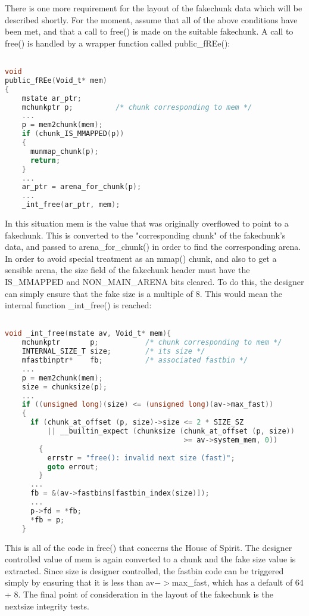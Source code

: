 \documentclass[12pt]{article}
\begin{document}
There is one more requirement for the layout of the fakechunk data
which will be described shortly. For the moment, assume that all of
the above conditions have been met, and that a call to free() is
made on the suitable fakechunk. A call to free() is handled by a
wrapper function called public\_fREe():
\begin{lstlisting}[language=C]

void
public_fREe(Void_t* mem)
{
    mstate ar_ptr;
    mchunkptr p;          /* chunk corresponding to mem */
    ...
    p = mem2chunk(mem);
    if (chunk_IS_MMAPPED(p))
    {
      munmap_chunk(p);
      return;
    }
    ...
    ar_ptr = arena_for_chunk(p);
    ...
    _int_free(ar_ptr, mem);
\end{lstlisting}
In this situation mem is the value that was originally overflowed
to point to a fakechunk. This is converted to the "corresponding
chunk" of the fakechunk's data, and passed to arena\_for\_chunk() in
order to find the corresponding arena. In order to avoid special
treatment as an mmap() chunk, and also to get a sensible arena, the
size field of the fakechunk header must have the IS\_MMAPPED and
NON\_MAIN\_ARENA bits cleared. To do this, the designer can simply
ensure that the fake size is a multiple of 8. This would mean the
internal function \_int\_free() is reached:
\begin{lstlisting}[language=C]

void _int_free(mstate av, Void_t* mem){
    mchunkptr       p;           /* chunk corresponding to mem */
    INTERNAL_SIZE_T size;        /* its size */
    mfastbinptr*    fb;          /* associated fastbin */
    ...
    p = mem2chunk(mem);
    size = chunksize(p);
    ...
    if ((unsigned long)(size) <= (unsigned long)(av->max_fast))
    {
      if (chunk_at_offset (p, size)->size <= 2 * SIZE_SZ
          || __builtin_expect (chunksize (chunk_at_offset (p, size))
                                          >= av->system_mem, 0))
        {
          errstr = "free(): invalid next size (fast)";
          goto errout;
        }
      ...
      fb = &(av->fastbins[fastbin_index(size)]);
      ...
      p->fd = *fb;
      *fb = p;
    }
\end{lstlisting}
This is all of the code in free() that concerns the House of
Spirit. The designer controlled value of mem is again converted to
a chunk and the fake size value is extracted. Since size is
designer controlled, the fastbin code can be triggered simply by
ensuring that it is less than av$->$max\_fast, which has a default of
64 + 8. The final point of consideration in the layout of the
fakechunk is the nextsize integrity tests.
\newline
\end{document}
